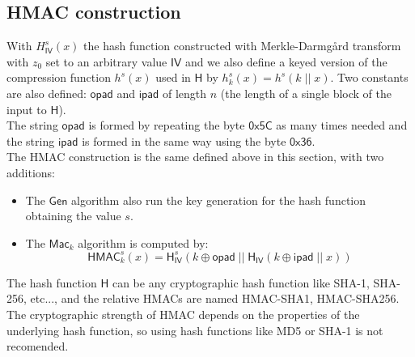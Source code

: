 \subsection{HMAC construction}
With $H^s_{\mathsf{IV}}(x)$ the hash function constructed with Merkle-Darmg\r{a}rd transform with $z_0$ set to an arbitrary value $\mathsf{IV}$ and we also define a keyed version of the compression function $h^s(x)$ used in $\mathsf{H}$ by $h^s_k(x) = h^s(k\;||\;x)$. Two constants are also defined: $\mathsf{opad}$ and $\mathsf{ipad}$ of length $n$ (the length of a single block of the input to $\mathsf{H}$).\\
The string $\mathsf{opad}$ is formed by repeating the byte $\mathsf{0x5C}$ as many times needed and the string $\mathsf{ipad}$ is formed in the same way using the byte $\mathsf{0x36}$.\\
The HMAC construction is the same defined above in this section, with two additions:
\begin{itemize}
    \item{The $\mathsf{Gen}$ algorithm also run the key generation for the hash function obtaining the value $s$.}
    \item{The $\mathsf{Mac}_k$ algorithm is computed by:
$$
    \mathsf{HMAC}^s_k(x) = \mathsf{H}^s_\mathsf{IV}(k \oplus \mathsf{opad}\;||\;\mathsf{H}_\mathsf{IV}(k \oplus \mathsf{ipad}\;||\;x))
$$
        }
\end{itemize}
The hash function $\mathsf{H}$ can be any cryptographic hash function like SHA-1, SHA-256, etc..., and the relative HMACs are named HMAC-SHA1, HMAC-SHA256. The cryptographic strength of HMAC depends on the properties of the underlying hash function, so using hash functions like MD5 or SHA-1 is not recomended.
